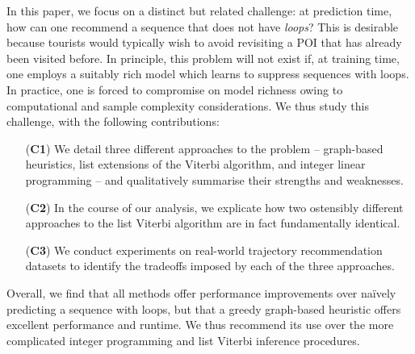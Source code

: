 In this paper, we focus on a distinct but related challenge:
at prediction time, how can one recommend a sequence that does not have \emph{loops}?
This is desirable because tourists would typically wish to avoid revisiting a POI that has already been visited before.
In principle, this problem will not exist if, at training time, one employs a suitably rich model which learns to suppress sequences with loops.
In practice, one is forced to compromise on model richness owing to computational and sample complexity considerations.
We thus study this challenge, with the following contributions:
\begin{enumerate}
	\item[(\textbf{C1})] We detail three different approaches to the problem -- 
	graph-based heuristics,
	list extensions of the Viterbi algorithm, and integer linear programming
	-- and qualitatively summarise their strengths and weaknesses.
	\item[(\textbf{C2})] In the course of our analysis, we explicate how two ostensibly different approaches to the list Viterbi algorithm \citep{seshadri1994list,nilsson2001sequentially} are in fact fundamentally identical.
	\item[(\textbf{C3})] We conduct experiments on real-world trajectory recommendation datasets to identify the tradeoffs imposed by each of the three approaches.
\end{enumerate}
Overall, we find that
all methods offer performance improvements over na\"{i}vely predicting a sequence with loops,
but that
a greedy graph-based heuristic offers excellent performance and runtime.
We thus recommend its use over the more complicated integer programming and list Viterbi inference procedures.

